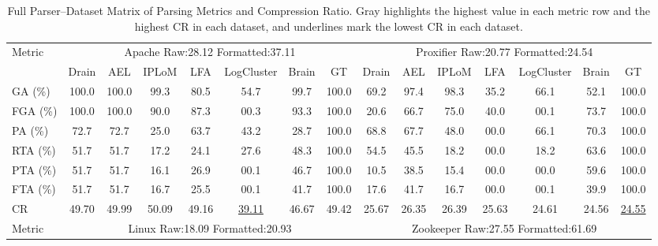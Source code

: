 \begin{table}[p]
\centering
\caption{Full Parser--Dataset Matrix of Parsing Metrics and Compression Ratio. Gray highlights the highest value in each metric row and the highest CR in each dataset, and underlines mark the lowest CR in each dataset.}
\label{tab:parser_cr_full}
\label{tab:parser_cr_full_a}
\label{tab:parser_cr_full_b}
\fontsize{5.75}{5.9}\selectfont
\setlength{\tabcolsep}{1.1pt}
\renewcommand{\arraystretch}{0.58}
\begin{adjustbox}{width=\textwidth,max totalheight=.86\textheight}
\begin{tabular}{l|ccccccc|ccccccc}
\toprule
\multirow{2}{*}{Metric} & \multicolumn{7}{c}{Apache Raw:28.12 Formatted:37.11} & \multicolumn{7}{c}{Proxifier Raw:20.77 Formatted:24.54} \\
\cmidrule(lr){2-8} \cmidrule(lr){9-15}
& Drain & AEL & IPLoM & LFA & LogCluster & Brain & GT & Drain & AEL & IPLoM & LFA & LogCluster & Brain & GT \\
\midrule
GA (\%) & \cellcolor{lightgray}100.0 & \cellcolor{lightgray}100.0 & 99.3 & 80.5 & 54.7 & 99.7 & \cellcolor{lightgray}100.0 & 69.2 & 97.4 & 98.3 & 35.2 & 66.1 & 52.1 & \cellcolor{lightgray}100.0 \\
FGA (\%) & \cellcolor{lightgray}100.0 & \cellcolor{lightgray}100.0 & 90.0 & 87.3 & 00.3 & 93.3 & \cellcolor{lightgray}100.0 & 20.6 & 66.7 & 75.0 & 40.0 & 00.1 & 73.7 & \cellcolor{lightgray}100.0 \\
PA (\%) & 72.7 & 72.7 & 25.0 & 63.7 & 43.2 & 28.7 & \cellcolor{lightgray}100.0 & 68.8 & 67.7 & 48.0 & 00.0 & 66.1 & 70.3 & \cellcolor{lightgray}100.0 \\
RTA (\%) & 51.7 & 51.7 & 17.2 & 24.1 & 27.6 & 48.3 & \cellcolor{lightgray}100.0 & 54.5 & 45.5 & 18.2 & 00.0 & 18.2 & 63.6 & \cellcolor{lightgray}100.0 \\
PTA (\%) & 51.7 & 51.7 & 16.1 & 26.9 & 00.1 & 46.7 & \cellcolor{lightgray}100.0 & 10.5 & 38.5 & 15.4 & 00.0 & 00.0 & 59.6 & \cellcolor{lightgray}100.0 \\
FTA (\%) & 51.7 & 51.7 & 16.7 & 25.5 & 00.1 & 41.7 & \cellcolor{lightgray}100.0 & 17.6 & 41.7 & 16.7 & 00.0 & 00.1 & 39.9 & \cellcolor{lightgray}100.0 \\
CR & 49.70 & 49.99 & \cellcolor{lightgray}50.09 & 49.16 & \underline{39.11} & 46.67 & 49.42 & 25.67 & 26.35 & \cellcolor{lightgray}26.39 & 25.63 & 24.61 & 24.56 & \underline{24.55} \\
\midrule
\multirow{2}{*}{Metric} & \multicolumn{7}{c}{Linux Raw:18.09 Formatted:20.93} & \multicolumn{7}{c}{Zookeeper Raw:27.55 Formatted:61.69} \\

\end{tabular}
\end{adjustbox}
\end{table}
